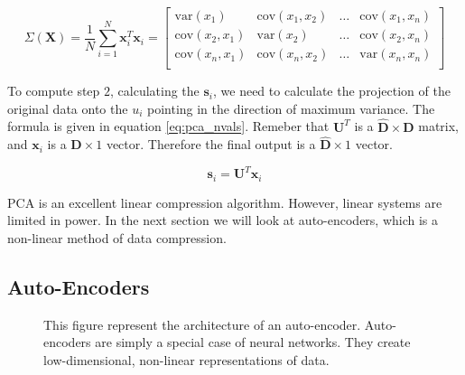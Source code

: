 \documentclass[11pt]{article}
\begin{document}
\begin{equation}\label{eq:cov_mat}
  \Sigma(\mathbf{X}) = \frac{1}{N}\sum_{i=1}^{N}\mathbf{x}_{i}^{T}\mathbf{x}_{i} = 
  \begin{bmatrix}
          \mathrm{var}(x_{1}) & \mathrm{cov}(x_{1},x_{2}) & \ldots & \mathrm{cov}(x_{1},x_{n}) \\
          \mathrm{cov}(x_{2},x_{1}) & \mathrm{var}(x_{2}) & \ldots & \mathrm{cov}(x_{2},x_{n}) \\
          \mathrm{cov}(x_{n},x_{1}) & \mathrm{cov}(x_{n},x_{2}) & \ldots & \mathrm{var}(x_{n},x_{n}) \\
  \end{bmatrix}
\end{equation}

To compute step $2$, calculating the $\mathbf{s}_{i}$, we need to calculate the projection of the original data onto the $u_{i}$ pointing in the direction of maximum variance. The formula is given in equation \ref{eq:pca_nvals}. Remeber that $\mathbf{U}^{T}$ is a $\mathbf{\hat{D}} \times \mathbf{D}$ matrix, and $\mathbf{x}_{i}$ is a $\mathbf{D} \times 1$ vector. Therefore the final output is a $\mathbf{\hat{D}} \times 1$ vector.

\begin{equation}\label{eq:pca_nvals}
  \mathbf{s}_{i} = \mathbf{U}^{T}\mathbf{x}_{i}
\end{equation}

PCA is an excellent linear compression algorithm. However, linear systems are limited in power. In the next section we will look at auto-encoders, which is a non-linear method of data compression.

\subsection{Auto-Encoders}

\begin{minipage}{0.47\linewidth}
  \begin{figure}[H]
    \centering
    
    \caption{This figure represent the architecture of an auto-encoder. Auto-encoders are simply a special case of neural networks. They create low-dimensional, non-linear representations of data.}
    \label{fig:autoenc_nn}
  \end{figure}
\end{minipage}\hfill
\begin{minipage}{0.47\linewidth}
\end{minipage}\vspace{0.5cm}
\end{document}
